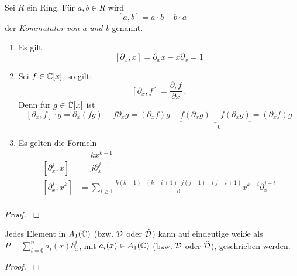 \begin{defn}[Kommutator]%
  Sei $R$ ein Ring. Für $a,b\in R$ wird
  \[[a,b]=a\cdot b-b\cdot a\]
  der \emph{Kommutator von a und b} genannt.
\end{defn}

\begin{prop} %
  \begin{enumerate}
    \item Es gilt
      \[[ \partial_x,x] = \partial_xx-x\partial_x=1 \]
    \item Sei $f\in \mathbb{C}[x]$, so gilt:
      \[ [\partial_x,f] = \frac{\partial,f}{\partial x} \,. \]
      Denn für $g\in \mathbb{C}[x]$ ist
      \[
        [\partial_x,f]\cdot g=\partial_x(fg)-f\partial_xg=
        (\partial_xf)g+\underset{=0}{\underbrace{ 
            f(\partial_xg)-f(\partial_xg)}}=
        (\partial_xf)g
      \]
    \item Es gelten die Formeln\\
    \begin{align*}
      [\partial_x,x^k]   &= kx^{k-1}\\
      [\partial_x^j,x]   &= j\partial_x^{j-1}\\
      [\partial_x^j,x^k] &= \sum_{i\geq1}\frac{k(k-1)\cdots(k-i+1)
        \cdot j(j-1)\cdots(j-i+1)}{i!}x^{k-i}\partial_x^{j-i} \\
    \end{align*}
  \end{enumerate}
\end{prop}
\begin{proof}
  \cite{ZulaBarbara}
\end{proof}

\begin{prop} \label{prop:weyl_eindeutige_schreibung}
  Jedes Element in $A_1(\mathbb{C})$ (bzw. $\mathcal{D}$ oder $\hat{\mathcal{D}}$) kann auf eindeutige
  weiße als $P=\sum_{i=0}^na_i(x)\partial_x^i$, mit $a_i(x)\in A_1(\mathbb{C})$ (bzw.
  $\mathcal{D}$ oder $\hat{\mathcal{D}}$), geschrieben werden. 
\end{prop}
\begin{proof}
  \cite[Proposition 1.2.3]{sabbah_cimpa90}
  \begin{comment}
    ein teil des Beweises ist "left as an exersice"
  \end{comment}
\end{proof}



